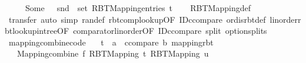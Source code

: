 \begin{isabellebody}
\ \ \ \ {\isacharbar}{\kern0pt}\ Some\ {\isacharunderscore}{\kern0pt}\ {\isasymRightarrow}\ {\isasymUnion}{\isacharparenleft}{\kern0pt}snd\ {\isacharbackquote}{\kern0pt}\ set\ {\isacharparenleft}{\kern0pt}RBT{\isacharunderscore}{\kern0pt}Mapping{}{\isachardot}{\kern0pt}entries\ t{\isacharparenright}{\kern0pt}{\isacharparenright}{\kern0pt}{\isacharparenright}{\kern0pt}{\isachardoublequoteclose}\isanewline
%
\isadelimproof
\ \ %
\endisadelimproof
%
\isatagproof
{}\isamarkupfalse%
\ RBT{\isacharunderscore}{\kern0pt}Mapping{\isacharunderscore}{\kern0pt}def\isanewline
\ \ \isamarkupfalse%
\ transfer\ {\isacharparenleft}{\kern0pt}auto\ simp{\isacharcolon}{\kern0pt}\ ran{\isacharunderscore}{\kern0pt}def\ rbt{\isacharunderscore}{\kern0pt}comp{\isacharunderscore}{\kern0pt}lookup{\isacharbrackleft}{\kern0pt}OF\ ID{\isacharunderscore}{\kern0pt}ccompare{\isacharprime}{\kern0pt}{\isacharbrackright}{\kern0pt}\ ord{\isachardot}{\kern0pt}is{\isacharunderscore}{\kern0pt}rbt{\isacharunderscore}{\kern0pt}def\ linorder{\isachardot}{\kern0pt}rbt{\isacharunderscore}{\kern0pt}lookup{\isacharunderscore}{\kern0pt}in{\isacharunderscore}{\kern0pt}tree{\isacharbrackleft}{\kern0pt}OF\ comparator{\isachardot}{\kern0pt}linorder{\isacharbrackleft}{\kern0pt}OF\ ID{\isacharunderscore}{\kern0pt}ccompare{\isacharprime}{\kern0pt}{\isacharbrackright}{\kern0pt}{\isacharbrackright}{\kern0pt}\ split{\isacharcolon}{\kern0pt}\ option{\isachardot}{\kern0pt}splits{\isacharparenright}{\kern0pt}{\isacharplus}{\kern0pt}%
\endisatagproof
{\isafoldproof}%
%
\isadelimproof
\isanewline
%
\endisadelimproof
\isanewline
{}\isamarkupfalse%
\ mapping{\isacharunderscore}{\kern0pt}combine{\isacharbrackleft}{\kern0pt}code{\isacharbrackright}{\kern0pt}{\isacharcolon}{\kern0pt}\isanewline
\ \ \ t\ {\isacharcolon}{\kern0pt}{\isacharcolon}{\kern0pt}\ {\isachardoublequoteopen}{\isacharparenleft}{\kern0pt}{\isacharprime}{\kern0pt}a\ {\isacharcolon}{\kern0pt}{\isacharcolon}{\kern0pt}\ ccompare{\isacharcomma}{\kern0pt}\ {\isacharprime}{\kern0pt}b{\isacharparenright}{\kern0pt}\ mapping{\isacharunderscore}{\kern0pt}rbt{\isachardoublequoteclose}\isanewline
\ \ \ {\isachardoublequoteopen}Mapping{\isachardot}{\kern0pt}combine\ f\ {\isacharparenleft}{\kern0pt}RBT{\isacharunderscore}{\kern0pt}Mapping\ t{\isacharparenright}{\kern0pt}\ {\isacharparenleft}{\kern0pt}RBT{\isacharunderscore}{\kern0pt}Mapping\ u{\isacharparenright}{\kern0pt}\ {\isacharequal}{\kern0pt}\isanewline

\end{isabellebody}
